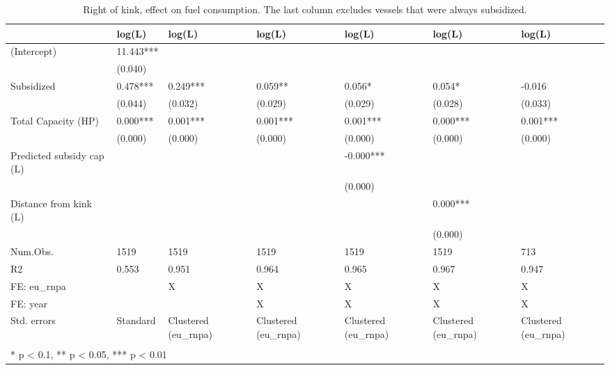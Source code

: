\begin{table}

\caption{\label{tab:}Right of kink, effect on fuel consumption. The last column excludes vessels that were always subsidized.}
\centering
\begin{tabular}[t]{lllllll}
\toprule
  & log(L) & log(L)  & log(L)   & log(L)    & log(L)     & log(L)     \\
\midrule
(Intercept) & 11.443*** &  &  &  &  & \\
 & (0.040) &  &  &  &  & \\
Subsidized & 0.478*** & 0.249*** & 0.059** & 0.056* & 0.054* & -0.016\\
 & (0.044) & (0.032) & (0.029) & (0.029) & (0.028) & (0.033)\\
Total Capacity (HP) & 0.000*** & 0.001*** & 0.001*** & 0.001*** & 0.000*** & 0.001***\\
 & (0.000) & (0.000) & (0.000) & (0.000) & (0.000) & (0.000)\\
Predicted subsidy cap (L) &  &  &  & -0.000*** &  & \\
 &  &  &  & (0.000) &  & \\
Distance from kink (L) &  &  &  &  & 0.000*** & \\
 &  &  &  &  & (0.000) & \\
\midrule
Num.Obs. & 1519 & 1519 & 1519 & 1519 & 1519 & 713\\
R2 & 0.553 & 0.951 & 0.964 & 0.965 & 0.967 & 0.947\\
FE: eu\_rnpa &  & X & X & X & X & X\\
FE: year &  &  & X & X & X & X\\
Std. errors & Standard & Clustered (eu\_rnpa) & Clustered (eu\_rnpa) & Clustered (eu\_rnpa) & Clustered (eu\_rnpa) & Clustered (eu\_rnpa)\\
\bottomrule
\multicolumn{7}{l}{\textsuperscript{} * p < 0.1, ** p < 0.05, *** p < 0.01}\\
\end{tabular}
\end{table}
